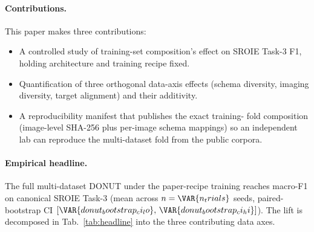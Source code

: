 \paragraph{Contributions.}  This paper makes three contributions:

\begin{itemize}
\item A controlled study of training-set composition's effect on
  SROIE Task-3 F1, holding architecture and training recipe fixed.
\item Quantification of three orthogonal data-axis effects (schema
  diversity, imaging diversity, target alignment) and their
  additivity.
\item A reproducibility manifest that publishes the exact training-
  fold composition (image-level SHA-256 plus per-image schema
  mappings) so an independent lab can reproduce the multi-dataset
  fold from the public corpora.
\end{itemize}

\paragraph{Empirical headline.}  The full multi-dataset DONUT under
the paper-recipe training reaches  macro-F1 on
canonical SROIE Task-3 (mean across $n=\VAR{n_trials}$ seeds,
paired-bootstrap CI $[\VAR{donut_bootstrap_ci_lo},\,
\VAR{donut_bootstrap_ci_hi}]$).  The lift is decomposed in
Tab.~\ref{tab:headline} into the three contributing data axes.
